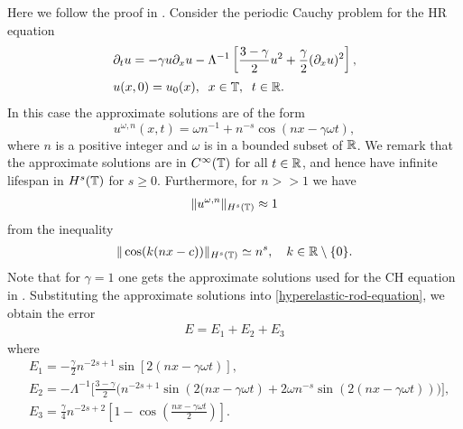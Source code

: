 %
Here we follow the proof in \cite{Himonas_2009_Non-uniform-dep-per}. 
Consider the periodic Cauchy problem for the HR equation
%
\begin{align}
& \partial_t u = -\gamma u \partial_x u  - \Lambda^{-1} \left[ \frac{3 - 
\gamma}{2}u^2 +
\frac{\gamma}{2}(\partial_x u)^2 \right] ,
\label{hyperelastic-rod-equation}
\\
& u(x,0) = u_0(x), \; \; x \in \mathbb{T}, \; \; t \in \mathbb{R}.  \label{init-cond}
\end{align}
%
%
%
In this case the  approximate solutions are of the form
%
%
\begin{equation}
\label{approx-solutions-form}
u^{\omega,n}(x,t) = \omega n^{-1} + n^{-s} \cos \left( nx - \gamma \omega t
\right), 
\end{equation}
where $n$ is a positive integer and $\omega$ is in a bounded subset of 
$\mathbb{R}$. We remark that the approximate 
solutions are in $C^\infty(\mathbb{T})$ for all $t \in \mathbb{R}$, and hence have 
infinite lifespan in $H^s(\mathbb{T})$ for $s  \ge 0$. Furthermore, for $n>>1$ we 
have 
%
%
\begin{equation}
	\label{bound-approx}
	\begin{split}
		\|u^{\omega,n} \|_{H^s(\mathbb{T})} \approx 1	
	\end{split}
\end{equation}
%
%
from the inequality
\begin{equation}
\label{1m}
\begin{split}
	\|\cos(k(nx-c))\|_{H^s(\mathbb{T})} \simeq n^s, \quad k \in \mathbb{R} \setminus
	\{0\}.
\end{split}
\end{equation}
%
%
%
%
Note that for $\gamma=1$ 
one gets the  approximate solutions
used for the CH equation in \cite{Himonas_2009_Non-uniform-dep-per}.
%
%
Substituting the approximate solutions into 
\eqref{hyperelastic-rod-equation}, we obtain the error
%
%
\begin{equation}
\begin{split}
E=
E_1 + E_2 + E_3 \label{57}
\end{split}
\end{equation}
%
%
where
\begin{align}
\label{90*}
& E_1 =
- \frac{\gamma}{2}n^{-2s+1}\sin\left[ 2\left( nx - \gamma \omega t \right)
\right],
\\
\label{90**}
& E_2 = - \Lambda^{-1} \bigg[ \frac{3-\gamma}{2} \bigg (
n^{-2s+1} \sin\left( 2(nx - \gamma \omega t \right) + 2\omega n^{-s} \sin( 
2(nx - \gamma \omega t))
\bigg )
\bigg ],
\\
& E_3 = \frac{\gamma}{4}
n^{-2s+2} \left [ 1- \cos \left (\frac{nx - \gamma \omega t}{2} \right) 
\right ].
\label{90}
\end{align}
